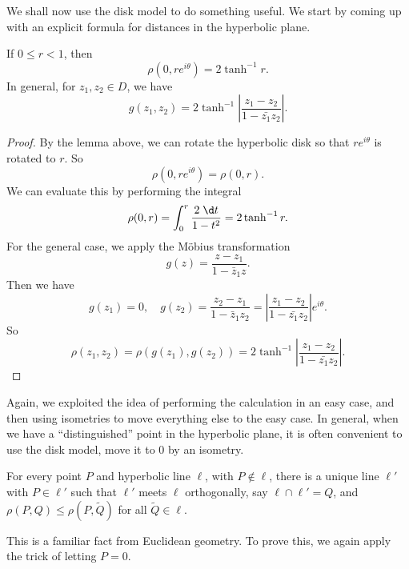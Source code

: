 \documentclass[a4paper]{article}
\begin{document}
We shall now use the disk model to do something useful. We start by coming up with an explicit formula for distances in the hyperbolic plane.
\begin{prop}
  If $0 \leq r < 1$, then
  \[
    \rho(0, r e^{i\theta}) = 2 \tanh^{-1} r.
  \]
  In general, for $z_1, z_2 \in D$, we have
  \[
    g(z_1, z_2) = 2 \tanh^{-1} \left|\frac{z_1 - z_2}{1 - \bar{z_1} z_2}\right|.
  \]
\end{prop}

\begin{proof}
  By the lemma above, we can rotate the hyperbolic disk so that $re^{i\theta}$ is rotated to $r$. So
  \[
    \rho(0, r e^{i\theta}) = \rho(0, r).
  \]
  We can evaluate this by performing the integral
  \[
    \rho(0, r) = \int_0^r \frac{2 \;\d t}{1 - t^2} = 2 \tanh^{-1} r.
  \]
  For the general case, we apply the M\"obius transformation
  \[
    g(z) = \frac{z - z_1}{1 - \bar{z}_1 z}.
  \]
  Then we have
  \[
    g(z_1) = 0,\quad g(z_2) = \frac{z_2 - z_1}{1 - \bar{z}_1 z_2} = \left|\frac{z_1 - z_2}{1 - \bar{z_1} z_2}\right| e^{i\theta}.
  \]
  So
  \[
    \rho(z_1, z_2) = \rho(g(z_1), g(z_2)) = 2 \tanh^{-1} \left|\frac{z_1 - z_2}{1 - \bar{z_1} z_2}\right|.
  \]
\end{proof}
Again, we exploited the idea of performing the calculation in an easy case, and then using isometries to move everything else to the easy case. In general, when we have a ``distinguished'' point in the hyperbolic plane, it is often convenient to use the disk model, move it to $0$ by an isometry.

\begin{prop}
  For every point $P$ and hyperbolic line $\ell$, with $P \not\in \ell$, there is a unique line $\ell'$ with $P \in \ell'$ such that $\ell'$ meets $\ell$ orthogonally, say $\ell \cap \ell' = Q$, and $\rho(P, Q) \leq \rho(P, \tilde{Q})$ for all $\tilde{Q} \in \ell$.
\end{prop}
This is a familiar fact from Euclidean geometry. To prove this, we again apply the trick of letting $P = 0$.
\end{document}
